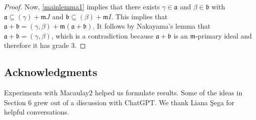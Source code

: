 \documentclass[10pt,reqno]{amsart}
\newtheorem{theorem}[subsection]{Theorem}
\theoremstyle{definition}
\theoremstyle{remark}
\numberwithin{equation}{section}
\newcommand{\Tor}{\mathrm{Tor}}
\newcommand{\kk}{\mathsf k}
\newcommand{\m}{\mathfrak m}
\newcommand{\nt}[2][$^\spadesuit$]{\hspace{0pt}#1\marginpar{\tt\raggedleft
    #1 #2}}
\newcommand{\dinesh}[2][$^\heartsuit$]{\nt[#1]{DL:#2}}
\numberwithin{equation}{section}
\begin{document}
\begin{proof}
    
    Now, \cref{mainlemma1} implies that there exists $\gamma \in \mathfrak a$ and $\beta \in \mathfrak b$ with $\mathfrak a\subseteq (\gamma)+\m J $ and $\mathfrak b\subseteq (\beta)+\m I $. This implies that $\mathfrak a+\mathfrak b = (\gamma,\beta)+\m( \mathfrak a+\mathfrak b)$. It follows by Nakayama's lemma that $\mathfrak a+\mathfrak b = (\gamma,\beta)$, which is a contradiction because $\mathfrak a + \mathfrak b$ is an $\m$-primary ideal and therefore it has grade 3.
\end{proof}

\begin{center}
    \section*{Acknowledgments}
\end{center}
    Experiments with Macaulay2 \cite{M2} helped us formulate results. 
    Some of the ideas in Section 6 grew out of a discussion with ChatGPT\cite{OpenAI2026ChatGPT}. We thank Liana \c{S}ega for helpful conversations.  
    


\end{document}
